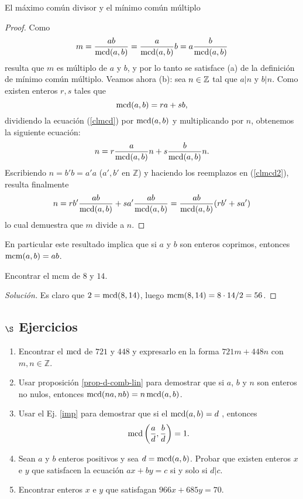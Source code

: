 \begin{section}{El máximo común divisor y el mínimo común
múltiplo}
\begin{proof}
Como
$$
m=\frac{a b}{\operatorname{mcd}(a,b)}=\frac{a}{\operatorname{mcd}(a,b)} b
=a\frac{b}{\operatorname{mcd}(a,b)}
$$
resulta que $m$ es múltiplo de $a$ y $b$, y por lo tanto se satisface (a) de la definición de mínimo común múltiplo. Veamos ahora (b): sea $n \in {\mathbb Z}$ tal que  $a|n$ y $b|n$. Como  existen enteros $r,s$ tales que 
\begin{equation}\label{clmcd}
\operatorname{mcd}(a,b)=ra+sb,
\end{equation} 
dividiendo la ecuación (\ref{clmcd}) por $\operatorname{mcd}(a,b)$ y multiplicando por $n$, obtenemos la si\-guien\-te ecuación:
\begin{equation}\label{clmcd2}
n= r\frac{a}{\operatorname{mcd}(a,b)}n + s\frac{b}{\operatorname{mcd}(a,b)}n.
\end{equation} 
Escribiendo $n=b'b=a'a$ ($a',b'$ en $\mathbb Z$) y haciendo los reemplazos en (\ref{clmcd2}), resulta
finalmente
\begin{equation}\label{clmcd3}
n= rb'\frac{a b}{\operatorname{mcd}(a,b)}+sa'\frac{a b}{\operatorname{mcd}(a,b)}= \frac{a
b}{\operatorname{mcd}(a,b)}(rb'+sa')
\end{equation}
lo cual demuestra que $m$ divide a $n$.
\end{proof}

En particular este resultado implica que si $a$ y $b$ son enteros
coprimos, entonces $\operatorname{mcm}(a,b)=ab$.


\begin{ejemplo} Encontrar el  mcm de $8$ y $14$.
	\begin{proof}[Solución] 
		Es claro que $2 = \operatorname{mcd}(8,14)$, luego $\operatorname{mcm}(8,14) = 8 \cdot 14 / 2 = 56$. 
	\end{proof}
\end{ejemplo}

\subsection*{\Large $\S$ Ejercicios}

\begin{enumerate}[1)]
\item Encontrar el $\operatorname{mcd}$ de $721$ y $448$ y expresarlo en la forma
$721m+448n$ con $m,n \in \mathbb Z$.
\item\label{imp} Usar  proposición \ref{prop-d-comb-lin} para demostrar que si $a$, $b$ y $n$ son enteros no nulos, entonces
$\operatorname{mcd}(na,nb)=n\operatorname{mcd}(a,b)$.
\item Usar el  Ej. \ref{imp} para demostrar que si el
$\operatorname{mcd}(a,b)=d$ , entonces
$$
\operatorname{mcd}\left(\frac{a}{d},\frac{b}{d}\right) =1.
$$
\item  Sean $a$ y $b$ enteros positivos y sea $d=\operatorname{mcd}(a,b)$. Probar que existen
enteros $ x$ e $y$ que satisfacen la ecuación $ax+by=c$ si y solo
si $d|c$.
\item  Encontrar enteros $x$ e $y$ que satisfagan $966x+685y=70.$
\end{enumerate}


\end{section}


